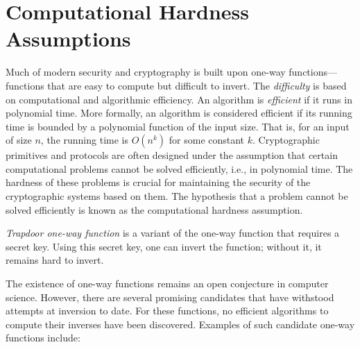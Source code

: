 \section{Computational Hardness Assumptions}

Much of modern security and cryptography is built upon one-way functions—functions that are easy to compute but difficult to invert. The \textit{difficulty} is based on computational and algorithmic efficiency. An algorithm is \textit{efficient} if it runs in polynomial time. More formally, an algorithm is considered efficient if its running time is bounded by a polynomial function of the input size. That is, for an input of size $n$, the running time is $O(n^k)$ for some constant $k$. Cryptographic primitives and protocols are often designed under the assumption that certain computational problems cannot be solved efficiently, i.e., in polynomial time. The hardness of these problems is crucial for maintaining the security of the cryptographic systems based on them. The hypothesis that a problem cannot be solved efficiently is known as the computational hardness assumption.

\textit{Trapdoor one-way function} is a variant of the one-way function that requires a secret key. Using this secret key, one can invert the function; without it, it remains hard to invert.

The existence of one-way functions remains an open conjecture in computer science. However, there are several promising candidates that have withstood attempts at inversion to date. For these functions, no efficient algorithms to compute their inverses have been discovered. Examples of such candidate one-way functions include:

